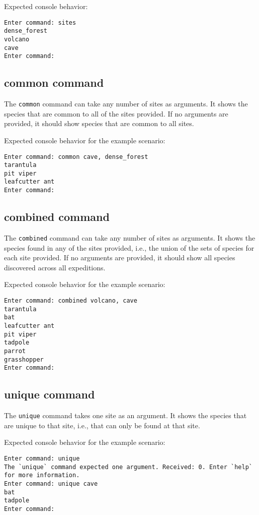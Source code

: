 \documentclass[12pt,letterpaper]{article}
\begin{document}
Expected console behavior:
\begin{lstlisting}
Enter command: sites
dense_forest
volcano
cave
Enter command: 
\end{lstlisting}

\subsection{common command}
The \texttt{common} command can take any number of sites as arguments. It shows the species that are common to all of the sites provided. If no arguments are provided, it should show species that are common to all sites.

Expected console behavior for the example scenario:
\begin{lstlisting}
Enter command: common cave, dense_forest
tarantula
pit viper
leafcutter ant
Enter command: 
\end{lstlisting}

\subsection{combined command}
The \texttt{combined} command can take any number of sites as arguments. It shows the species found in any of the sites provided, i.e., the union of the sets of species for each site provided. If no arguments are provided, it should show all species discovered across all expeditions.

Expected console behavior for the example scenario:
\begin{lstlisting}
Enter command: combined volcano, cave
tarantula
bat
leafcutter ant
pit viper
tadpole
parrot
grasshopper
Enter command: 
\end{lstlisting}

\subsection{unique command}
The \texttt{unique} command takes one site as an argument. It shows the species that are unique to that site, i.e., that can only be found at that site.

Expected console behavior for the example scenario:
\begin{lstlisting}
Enter command: unique
The `unique` command expected one argument. Received: 0. Enter `help` for more information.
Enter command: unique cave
bat
tadpole
Enter command: 
\end{lstlisting}
\end{document}
